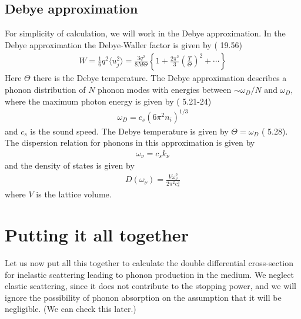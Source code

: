 \documentclass{article}
\begin{document}
\subsection{Debye approximation}

For simplicity of calculation, we will work in the Debye approximation. In the Debye approximation the Debye-Waller factor is given by (\cite{quantum} 19.56)
\begin{align}
W = \frac16 q^2 \langle u_j^2 \rangle = \frac{3 q^2}{8 M \Theta}\left\{ 1 + \frac{2 \pi^2}{3}\left( \frac{T}{\Theta} \right)^2 + \cdots \right\}
\end{align}
Here $\Theta$ there is the Debye temperature. The Debye approximation describes a phonon distribution of $N$ phonon modes with energies between $ \sim \omega_D / N$ and $\omega_D$, where the maximum photon energy is given by (\cite{intro} 5.21-24)
\begin{align}
\omega_D = c_s(6 \pi^2 n_i)^{1/3}
\end{align}
and $c_s$ is the sound speed. The Debye temperature is given by $\Theta = \omega_D$ (\cite{intro} 5.28). The dispersion relation for phonons in this approximation is given by
\begin{align}
\omega_\nu = c_sk_\nu
\end{align}
and the density of states is given by
\begin{align}
D(\omega_\nu) = \frac{V\omega_\nu^2}{2 \pi^2 c_s^3}
\end{align}
where $V$ is the lattice volume.

\section{Putting it all together}

Let us now put all this together to calculate the double differential cross-section for inelastic scattering leading to phonon production in the medium. We neglect elastic scattering, since it does not contribute to the stopping power, and we will ignore the possibility of phonon absorption on the assumption that it will be negligible. (We can check this later.)
\end{document}
